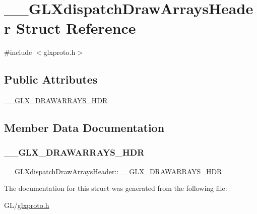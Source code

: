 \hypertarget{struct_____g_l_xdispatch_draw_arrays_header}{}\section{\+\_\+\+\_\+\+G\+L\+Xdispatch\+Draw\+Arrays\+Header Struct Reference}
\label{struct_____g_l_xdispatch_draw_arrays_header}


{\ttfamily \#include $<$glxproto.\+h$>$}

\subsection*{Public Attributes}
\begin{DoxyCompactItemize}
\item 
\hyperlink{struct_____g_l_xdispatch_draw_arrays_header_a8990cf1ed80ccb12b4089eed832547f8}{\+\_\+\+\_\+\+G\+L\+X\+\_\+\+D\+R\+A\+W\+A\+R\+R\+A\+Y\+S\+\_\+\+H\+DR}
\end{DoxyCompactItemize}


\subsection{Member Data Documentation}
\mbox{\label{struct_____g_l_xdispatch_draw_arrays_header_a8990cf1ed80ccb12b4089eed832547f8}} 
\subsubsection{\texorpdfstring{\+\_\+\+\_\+\+G\+L\+X\+\_\+\+D\+R\+A\+W\+A\+R\+R\+A\+Y\+S\+\_\+\+H\+DR}{\_\_GLX\_DRAWARRAYS\_HDR}}
{\footnotesize\ttfamily \+\_\+\+\_\+\+G\+L\+Xdispatch\+Draw\+Arrays\+Header\+::\+\_\+\+\_\+\+G\+L\+X\+\_\+\+D\+R\+A\+W\+A\+R\+R\+A\+Y\+S\+\_\+\+H\+DR}



The documentation for this struct was generated from the following file\+:\begin{DoxyCompactItemize}
\item 
G\+L/\hyperlink{glxproto_8h}{glxproto.\+h}\end{DoxyCompactItemize}
